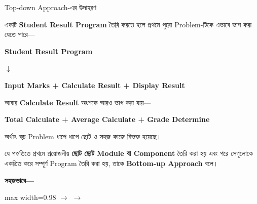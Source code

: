 \begin{examplebox}{Top-down Approach-এর উদাহরণ}

একটি \textbf{Student Result Program} তৈরি করতে হলে প্রথমে
পুরো Problem-টিকে এভাবে ভাগ করা যেতে পারে—

\begin{center}

\textbf{
Student Result Program
}

\(\downarrow\)

\textbf{
Input Marks
\quad + \quad
Calculate Result
\quad + \quad
Display Result
}

\end{center}

আবার \textbf{Calculate Result} অংশকে আরও ভাগ করা যায়—

\begin{center}

\textbf{
Total Calculate
\quad + \quad
Average Calculate
\quad + \quad
Grade Determine
}

\end{center}

অর্থাৎ বড় Problem ধাপে ধাপে ছোট ও সহজ কাজে বিভক্ত হয়েছে।

\end{examplebox}


\begin{definitionbox}

যে পদ্ধতিতে প্রথমে প্রয়োজনীয়
\textbf{ছোট ছোট Module বা Component} তৈরি করা হয় এবং পরে
সেগুলোকে একত্রিত করে সম্পূর্ণ Program তৈরি করা হয়,
তাকে \textbf{Bottom-up Approach} বলে।

\end{definitionbox}

\textbf{সহজভাবে—}

\begin{center}
\begin{adjustbox}{max width=0.98\linewidth}
\quad
\(\longrightarrow\)
\quad
{}
\quad
\(\longrightarrow\)
\quad
{}
\end{adjustbox}
\end{center}

